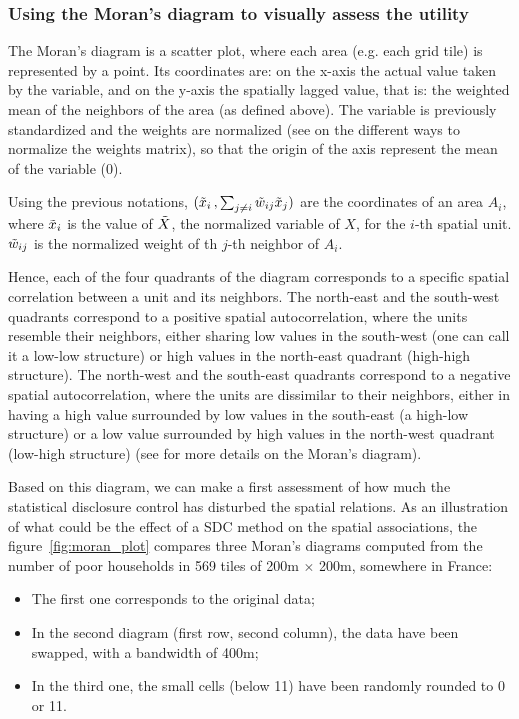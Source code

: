 \subsubsection{Using the Moran's diagram to visually assess the utility}

The Moran's diagram is a scatter plot, where each area (e.g. each grid tile) is represented by a point. Its coordinates are: on the x-axis the actual value taken by the variable, and on the y-axis the spatially lagged value, that is: the weighted mean of the neighbors of the area (as defined above). The variable is previously standardized and the weights are normalized (see \cite{BellefonEtAlt_2018} on the different ways to normalize the weights matrix), so that the origin of the axis represent the mean of the variable (0). 

Using the previous notations, $(\Tilde{x}_i\,, \sum_{j \neq i}{\Tilde{w}_{ij}\Tilde{x}_j})$ are the coordinates of an area $A_i$, where $\Tilde{x}_i$ is the value of $\Tilde{X}$, the normalized variable of $X$, for the $i$-th spatial unit. $\Tilde{w}_{ij}$ is the normalized weight of th $j$-th neighbor of $A_i$.

Hence, each of the four quadrants of the diagram corresponds to a specific spatial correlation between a unit and its neighbors. The north-east and the south-west quadrants correspond to a positive spatial autocorrelation, where the units resemble their neighbors, either sharing low values in the south-west (one can call it a low-low structure) or high values in the north-east quadrant (high-high structure). The north-west and the south-east quadrants correspond to a negative spatial autocorrelation, where the units are dissimilar to their neighbors, either in having a high value surrounded by low values in the south-east (a high-low structure) or a low value surrounded by high values in the north-west quadrant (low-high structure) (see \cite{SalimaEtAlt_2018} for more details on the Moran's diagram).

Based on this diagram, we can make a first assessment of how much the statistical disclosure control has disturbed the spatial relations. As an illustration of what could be the effect of a SDC method on the spatial associations, the figure~\ref{fig:moran_plot} compares three Moran's diagrams computed from the number of poor households in 569 tiles of 200m $\times$ 200m, somewhere in France:

\begin{itemize}
    \item The first one corresponds to the original data;
    \item In the second diagram (first row, second column), the data have been swapped, with a bandwidth of 400m;
    \item In the third one, the small cells (below 11) have been randomly rounded to 0 or 11.
\end{itemize}

